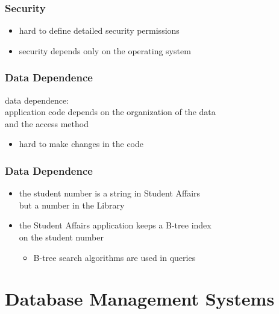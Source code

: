 \documentclass[dvipsnames]{beamer}
\theoremstyle{plain}
\begin{document}
\begin{frame}
  \frametitle{Security}

  \begin{itemize}
    \item hard to define detailed security permissions
    \item security depends only on the operating system
  \end{itemize}
\end{frame}

\begin{frame}
  \frametitle{Data Dependence}

  \begin{definition}
    \alert{data dependence}:\\
      application code depends on the organization of the data\\
      and the access method

    \begin{itemize}
      \item hard to make changes in the code
    \end{itemize}
  \end{definition}
\end{frame}

\begin{frame}
  \frametitle{Data Dependence}

  \begin{example}
    \begin{itemize}
      \item the student number is a string in Student Affairs\\
        but a number in the Library

      \pause
      \item the Student Affairs application keeps a B-tree index\\
        on the student number
      \begin{itemize}
        \item B-tree search algorithms are used in queries
      \end{itemize}
    \end{itemize}
  \end{example}
\end{frame}

\section{Database Management Systems}
\end{document}

